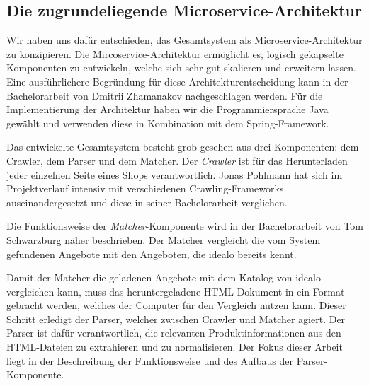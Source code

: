 \subsection{Die zugrundeliegende Microservice-Architektur}
\label{subsec:microservice-architektur}

Wir haben uns dafür entschieden, das Gesamtsystem als Microservice-Architektur zu konzipieren.
Die Mircoservice-Architektur ermöglicht es, logisch gekapselte Komponenten zu entwickeln, welche sich sehr gut
skalieren und erweitern lassen.
Eine ausführlichere Begründung für diese Architekturentscheidung kann in der Bachelorarbeit von Dmitrii
Zhamanakov nachgeschlagen werden.
Für die Implementierung der Architektur haben wir die Programmiersprache Java gewählt und verwenden diese in
Kombination mit dem Spring-Framework.

Das entwickelte Gesamtsystem besteht grob gesehen aus drei Komponenten: dem Crawler, dem Parser und dem Matcher.
Der \textit{Crawler} ist für das Herunterladen jeder einzelnen Seite eines Shops verantwortlich.
Jonas Pohlmann hat sich im Projektverlauf intensiv mit verschiedenen Crawling-Frameworks auseinandergesetzt und diese
in seiner Bachelorarbeit verglichen.

Die Funktionsweise der \textit{Matcher}-Komponente wird in der Bachelorarbeit von Tom Schwarzburg näher beschrieben.
Der Matcher vergleicht die vom System gefundenen Angebote mit den Angeboten, die idealo bereits kennt.

Damit der Matcher die geladenen Angebote mit dem Katalog von idealo vergleichen kann, muss das heruntergeladene
HTML-Dokument in ein Format gebracht werden, welches der Computer für den Vergleich nutzen kann.
Dieser Schritt erledigt der Parser, welcher zwischen Crawler und Matcher agiert.
Der Parser ist dafür verantwortlich, die relevanten Produktinformationen aus den HTML-Dateien zu extrahieren und zu
normalisieren.
Der Fokus dieser Arbeit liegt in der Beschreibung der Funktionsweise und des Aufbaus der Parser-Komponente.